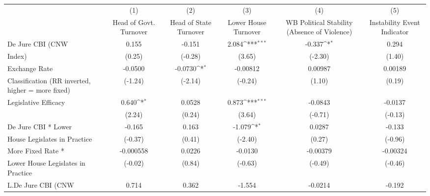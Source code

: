 {
\def\sym#1{\ifmmode^{#1}\else\(^{#1}\)\fi}
\begin{tabular}{l*{5}{c}}
\hline\hline
                    &\multicolumn{1}{c}{(1)}&\multicolumn{1}{c}{(2)}&\multicolumn{1}{c}{(3)}&\multicolumn{1}{c}{(4)}&\multicolumn{1}{c}{(5)}\\
                    &\multicolumn{1}{c}{Head of Govt. Turnover}&\multicolumn{1}{c}{Head of State Turnover}&\multicolumn{1}{c}{Lower House Turnover}&\multicolumn{1}{c}{WB Political Stability (Absence of Violence)}&\multicolumn{1}{c}{Instability Event Indicator}\\
\hline
De Jure CBI (CNW    &       0.155         &      -0.151         &       2.084\sym{***}&      -0.337\sym{*}  &       0.294         \\
Index)              &      (0.25)         &     (-0.28)         &      (3.65)         &     (-2.30)         &      (1.40)         \\
[1em]
Exchange Rate       &     -0.0500         &     -0.0730\sym{*}  &    -0.00812         &     0.00987         &     0.00189         \\
Classification (RR inverted, higher = more fixed)&     (-1.24)         &     (-2.14)         &     (-0.24)         &      (1.10)         &      (0.19)         \\
[1em]
Legislative Efficacy&       0.640\sym{*}  &      0.0528         &       0.873\sym{***}&     -0.0843         &     -0.0137         \\
                    &      (2.24)         &      (0.24)         &      (3.64)         &     (-0.71)         &     (-0.13)         \\
[1em]
De Jure CBI * Lower &      -0.165         &       0.163         &      -1.079\sym{*}  &      0.0287         &      -0.133         \\
House Legislates in Practice&     (-0.37)         &      (0.41)         &     (-2.40)         &      (0.27)         &     (-0.96)         \\
[1em]
More Fixed Rate *   &   -0.000558         &      0.0226         &     -0.0130         &    -0.00379         &    -0.00324         \\
Lower House Legislates in Practice&     (-0.02)         &      (0.84)         &     (-0.63)         &     (-0.49)         &     (-0.46)         \\
[1em]
L.De Jure CBI (CNW  &       0.714         &       0.362         &      -1.554         &     -0.0214         &      -0.192         \\

\end{tabular}}
